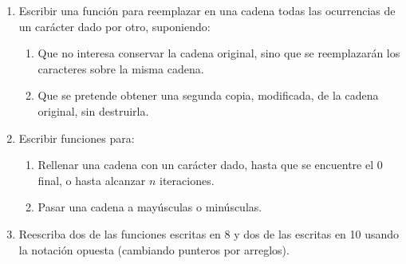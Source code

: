 \begin{enumerate}
	\item Escribir una función para reemplazar en una cadena todas las ocurrencias de
un carácter dado por otro, suponiendo:
	\begin{enumerate}[label=\alph*.]
\item Que no interesa conservar la cadena original, sino que se reemplazarán
      los caracteres sobre la misma cadena.
\item Que se pretende obtener una segunda copia, modificada, de la cadena
      original, sin destruirla.
	\end{enumerate}

	\item Escribir funciones para:
	\begin{enumerate}[label=\alph*.]
\item Rellenar una cadena con un carácter dado, hasta que se encuentre el $0$
      final, o hasta alcanzar $n$ iteraciones.
\item Pasar una cadena a mayúsculas o minúsculas.
	\end{enumerate}

	\item Reescriba dos de las funciones escritas en 8 y dos de las escritas en 10
usando la notación opuesta (cambiando punteros por arreglos).

\end{enumerate}


